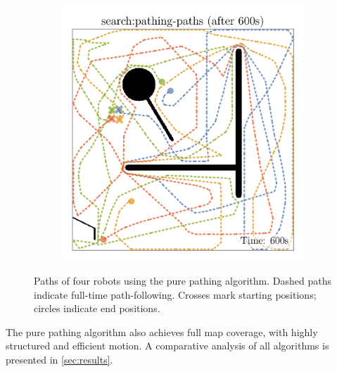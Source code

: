 \begin{figure}[H]
\begin{subfigure}[b]{\w}
    \end{subfigure}
    \begin{subfigure}[b]{\w}
        \centering
        \includegraphics[width=\textwidth]{./figures/plots/paths/search:pathing-paths-(after-600s).png}
    \end{subfigure}
    \caption{Paths of four robots using the pure pathing algorithm. Dashed paths indicate full-time path-following. Crosses mark starting positions; circles indicate end positions.}
    \label{fig:pure-pathing-paths}
\end{figure}

The pure pathing algorithm also achieves full map coverage, with highly structured and efficient motion. A comparative analysis of all algorithms is presented in \cref{sec:results}.

